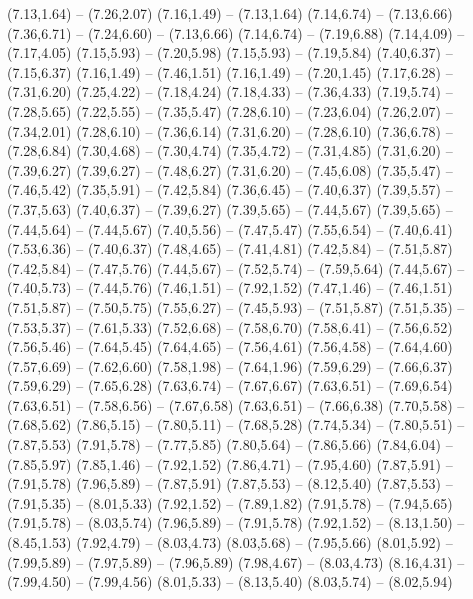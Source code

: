 {  (7.13,1.64) -- (7.26,2.07)
  (7.16,1.49) -- (7.13,1.64)
  (7.14,6.74) -- (7.13,6.66)
  (7.36,6.71) -- (7.24,6.60) -- (7.13,6.66)
  (7.14,6.74) -- (7.19,6.88)
  (7.14,4.09) -- (7.17,4.05)
  (7.15,5.93) -- (7.20,5.98)
  (7.15,5.93) -- (7.19,5.84)
  (7.40,6.37) -- (7.15,6.37)
  (7.16,1.49) -- (7.46,1.51)
  (7.16,1.49) -- (7.20,1.45)
  (7.17,6.28) -- (7.31,6.20)
  (7.25,4.22) -- (7.18,4.24)
  (7.18,4.33) -- (7.36,4.33)
  (7.19,5.74) -- (7.28,5.65)
  (7.22,5.55) -- (7.35,5.47)
  (7.28,6.10) -- (7.23,6.04)
  (7.26,2.07) -- (7.34,2.01)
  (7.28,6.10) -- (7.36,6.14)
  (7.31,6.20) -- (7.28,6.10)
  (7.36,6.78) -- (7.28,6.84)
  (7.30,4.68) -- (7.30,4.74)
  (7.35,4.72) -- (7.31,4.85)
  (7.31,6.20) -- (7.39,6.27)
  (7.39,6.27) -- (7.48,6.27)
  (7.31,6.20) -- (7.45,6.08)
  (7.35,5.47) -- (7.46,5.42)
  (7.35,5.91) -- (7.42,5.84)
  (7.36,6.45) -- (7.40,6.37)
  (7.39,5.57) -- (7.37,5.63)
  (7.40,6.37) -- (7.39,6.27)
  (7.39,5.65) -- (7.44,5.67)
  (7.39,5.65) -- (7.44,5.64) -- (7.44,5.67)
  (7.40,5.56) -- (7.47,5.47)
  (7.55,6.54) -- (7.40,6.41)
  (7.53,6.36) -- (7.40,6.37)
  (7.48,4.65) -- (7.41,4.81)
  (7.42,5.84) -- (7.51,5.87)
  (7.42,5.84) -- (7.47,5.76)
  (7.44,5.67) -- (7.52,5.74) -- (7.59,5.64)
  (7.44,5.67) -- (7.40,5.73) -- (7.44,5.76)
  (7.46,1.51) -- (7.92,1.52)
  (7.47,1.46) -- (7.46,1.51)
  (7.51,5.87) -- (7.50,5.75)
  (7.55,6.27) -- (7.45,5.93) -- (7.51,5.87)
  (7.51,5.35) -- (7.53,5.37) -- (7.61,5.33)
  (7.52,6.68) -- (7.58,6.70)
  (7.58,6.41) -- (7.56,6.52)
  (7.56,5.46) -- (7.64,5.45)
  (7.64,4.65) -- (7.56,4.61)
  (7.56,4.58) -- (7.64,4.60)
  (7.57,6.69) -- (7.62,6.60)
  (7.58,1.98) -- (7.64,1.96)
  (7.59,6.29) -- (7.66,6.37)
  (7.59,6.29) -- (7.65,6.28)
  (7.63,6.74) -- (7.67,6.67)
  (7.63,6.51) -- (7.69,6.54)
  (7.63,6.51) -- (7.58,6.56) -- (7.67,6.58)
  (7.63,6.51) -- (7.66,6.38)
  (7.70,5.58) -- (7.68,5.62)
  (7.86,5.15) -- (7.80,5.11) -- (7.68,5.28)
  (7.74,5.34) -- (7.80,5.51) -- (7.87,5.53)
  (7.91,5.78) -- (7.77,5.85)
  (7.80,5.64) -- (7.86,5.66)
  (7.84,6.04) -- (7.85,5.97)
  (7.85,1.46) -- (7.92,1.52)
  (7.86,4.71) -- (7.95,4.60)
  (7.87,5.91) -- (7.91,5.78)
  (7.96,5.89) -- (7.87,5.91)
  (7.87,5.53) -- (8.12,5.40)
  (7.87,5.53) -- (7.91,5.35) -- (8.01,5.33)
  (7.92,1.52) -- (7.89,1.82)
  (7.91,5.78) -- (7.94,5.65)
  (7.91,5.78) -- (8.03,5.74)
  (7.96,5.89) -- (7.91,5.78)
  (7.92,1.52) -- (8.13,1.50) -- (8.45,1.53)
  (7.92,4.79) -- (8.03,4.73)
  (8.03,5.68) -- (7.95,5.66)
  (8.01,5.92) -- (7.99,5.89) -- (7.97,5.89) -- (7.96,5.89)
  (7.98,4.67) -- (8.03,4.73)
  (8.16,4.31) -- (7.99,4.50) -- (7.99,4.56)
  (8.01,5.33) -- (8.13,5.40)
  (8.03,5.74) -- (8.02,5.94)
}

